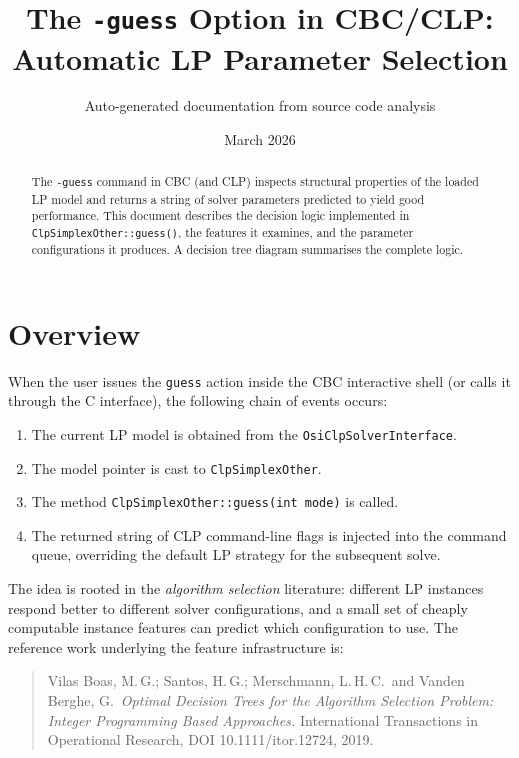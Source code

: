 \documentclass[11pt,a4paper]{article}
\title{The \texttt{-guess} Option in CBC/CLP:\\Automatic LP Parameter Selection}
\author{Auto-generated documentation from source code analysis}
\date{March 2026}
\begin{document}
\maketitle

\begin{abstract}
The \texttt{-guess} command in CBC (and CLP) inspects structural properties
of the loaded LP model and returns a string of solver parameters predicted to
yield good performance.  This document describes the decision logic
implemented in \texttt{ClpSimplexOther::guess()}, the features it examines,
and the parameter configurations it produces.  A decision tree diagram
summarises the complete logic.
\end{abstract}

\tableofcontents

\section{Overview}

When the user issues the \texttt{guess} action inside the CBC interactive
shell (or calls it through the C interface), the following chain of events
occurs:

\begin{enumerate}
  \item The current LP model is obtained from the \texttt{OsiClpSolverInterface}.
  \item The model pointer is cast to \texttt{ClpSimplexOther}.
  \item The method \texttt{ClpSimplexOther::guess(int mode)} is called.
  \item The returned string of CLP command-line flags is injected into the
        command queue, overriding the default LP strategy for the subsequent
        solve.
\end{enumerate}

The idea is rooted in the \emph{algorithm selection} literature: different LP
instances respond better to different solver configurations, and a small set
of cheaply computable instance features can predict which configuration to
use.  The reference work underlying the feature infrastructure is:

\begin{quote}
Vilas Boas, M.\,G.; Santos, H.\,G.; Merschmann, L.\,H.\,C.\ and Vanden
Berghe, G.\ \emph{Optimal Decision Trees for the Algorithm Selection Problem:
Integer Programming Based Approaches.}  International Transactions in
Operational Research, DOI 10.1111/itor.12724, 2019.
\end{quote}
\end{document}
